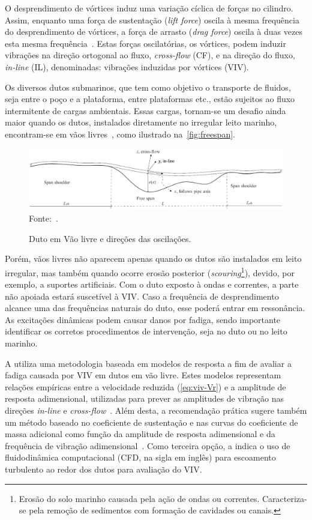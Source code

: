 O desprendimento de vórtices induz uma variação cíclica de forças no cilindro.
Assim, enquanto uma força de sustentação (\textit{lift force}) oscila à mesma frequência do desprendimento de vórtices, a força de arrasto (\textit{drag force}) oscila à duas vezes esta mesma frequência~\cite{Sumer1995}.
Estas forças oscilatórias, os vórtices, podem induzir vibrações na direção ortogonal ao fluxo, \textit{cross-flow} (CF), e na direção do fluxo, \textit{in-line} (IL), denominadas: vibrações induzidas por vórtices (VIV).

Os diversos dutos submarinos, que tem como objetivo o transporte de fluidos, seja entre o poço e a plataforma, entre plataformas etc., estão sujeitos ao fluxo intermitente de cargas ambientais.
Essas cargas, tornam-se um desafio ainda maior quando os dutos, instalados diretamente no irregular leito marinho, encontram-se em vãos livres~\cite{Fyrileiv1998}, como ilustrado na~\autoref{fig:freespan}.

\begin{figure}[!ht]
	\centering
    \caption{Duto em Vão livre e direções das oscilações.}\label{fig:freespan}
	\includegraphics[width=1\textwidth]{imagens/freespan}
    \\Fonte:~.
\end{figure}

Porém, vãos livres não aparecem apenas quando os dutos são instalados em leito irregular, mas também quando ocorre erosão posterior (\textit{scouring}\footnote{Erosão do solo marinho causada pela ação de ondas ou correntes. Caracteriza-se pela remoção de sedimentos com formação de cavidades ou canais.}), devido, por exemplo, a suportes artificiais.
Com o duto exposto à ondas e correntes, a parte não apoiada estará suscetível à VIV.\@
Caso a frequência de desprendimento alcance uma das frequências naturais do duto, esse poderá entrar em ressonância.
As excitações dinâmicas podem causar danos por fadiga, sendo importante identificar os corretos procedimentos de intervenção, seja no duto ou no leito marinho.

A  utiliza uma metodologia baseada em modelos de resposta a fim de avaliar a fadiga causada por VIV em dutos em vão livre.
Estes modelos representam relações empíricas entre a velocidade reduzida (\autoref{eq:viv-Vr}) e a amplitude de resposta adimensional, utilizadas para prever as amplitudes de vibração nas direções \textit{in-line} e \textit{cross-flow}~\cite{Mork2003,DNV2017}.
Além desta, a recomendação prática sugere também um método baseado no coeficiente de sustentação e nas curvas do coeficiente de massa adicional como função da amplitude de resposta adimensional e da frequência de vibração adimensional~\cite{DNV2017}.
Como terceira opção, a  indica o uso de fluidodinâmica computacional (CFD, na sigla em inglês) para escoamento turbulento ao redor dos dutos para avaliação do VIV.\@

